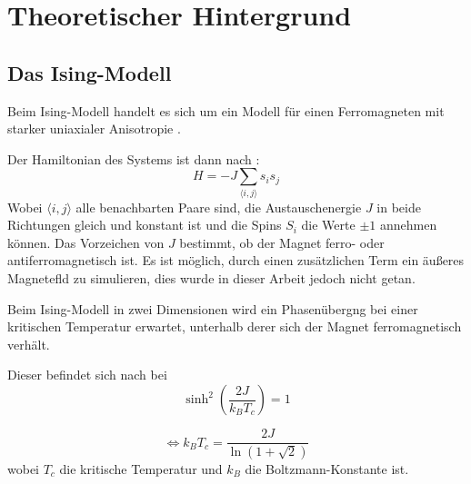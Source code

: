 \documentclass{scrreprt}
\begin{document}
	
	
	\chapter{Theoretischer Hintergrund}
	
	\section{Das Ising-Modell}
	Beim Ising-Modell handelt es sich um ein Modell für einen Ferromagneten mit starker uniaxialer Anisotropie \cite[S. 7]{binderheermann}. %
	
	Der Hamiltonian des Systems ist dann nach \cite[S. 7]{binderheermann}:
	\begin{equation}
	H=-J\sum_{\langle i,j\rangle }s_is_j
	\label{eq:hamiltonianising}
	\end{equation}
	Wobei $\langle i,j\rangle$ alle benachbarten Paare sind, die Austauschenergie $J$ in beide Richtungen gleich und konstant ist und die Spins $S_i$ die  Werte $\pm 1$ annehmen können. Das Vorzeichen von $J$ bestimmt, ob der Magnet ferro- oder antiferromagnetisch ist. Es ist möglich, durch einen zusätzlichen Term ein äußeres Magnetefld zu simulieren, dies wurde in dieser Arbeit jedoch nicht getan.%

	
	Beim Ising-Modell in zwei Dimensionen wird ein Phasenübergng bei einer kritischen Temperatur erwartet, unterhalb derer sich der Magnet ferromagnetisch verhält\cite[vgl. ][]{peierls_1936}.
	
	Dieser befindet sich nach \cite{OnsagerCrystal1} bei \[\sinh^2\left(\frac{2J}{k_BT_c}\right) =1\]
	
	\begin{equation}
	\Leftrightarrow k_BT_c=\frac{2J}{\ln(1+\sqrt{2})}
	\label{eq:kritischetemperatur}
	\end{equation}
	wobei $T_c$ die kritische Temperatur und $k_B$ die Boltzmann-Konstante ist.
	
\end{document}
